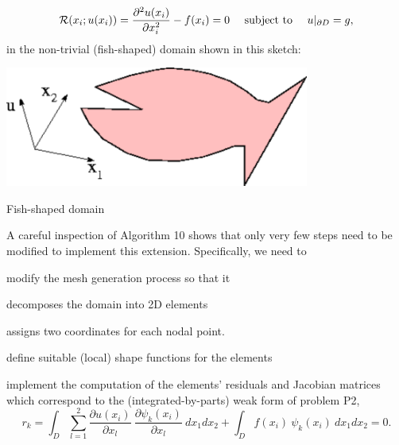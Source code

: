 \[ {\cal R}(x_i; u(x_i)) = \frac{\partial^2 u(x_i)}{\partial x_i^2} - f(x_i) =0 \mbox{ \ \ \ subject to \ \ \ } u|_{\partial D} = g, \] in the non-\/trivial (fish-\/shaped) domain shown in this sketch\-:  
\begin{DoxyImage}
\includegraphics[width=0.75\textwidth]{fish_domain}
\caption{Fish-\/shaped domain }
\end{DoxyImage}
 A careful inspection of Algorithm 10 shows that only very few steps need to be modified to implement this extension. Specifically, we need to
\begin{DoxyItemize}
\item modify the mesh generation process so that it
\begin{DoxyItemize}
\item decomposes the domain into 2\-D elements
\item assigns two coordinates for each nodal point.
\end{DoxyItemize}
\item define suitable (local) shape functions for the elements
\item implement the computation of the elements' residuals and Jacobian matrices which correspond to the (integrated-\/by-\/parts) weak form of problem P2, \[ r_k = \int_D \sum_{l=1}^2 \frac{\partial u(x_i)}{\partial x_l} \ \frac{\partial \psi_k(x_i)}{\partial x_l} \ dx_1 dx_2 + \int_D f(x_i) \ \psi_k(x_i) \ dx_1 dx_2 =0. \]
\end{DoxyItemize}


